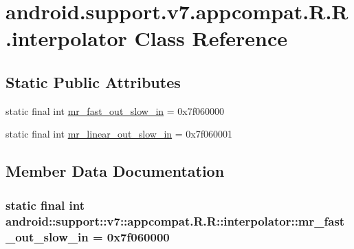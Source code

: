 \hypertarget{classandroid_1_1support_1_1v7_1_1appcompat_1_1_r_1_1interpolator}{
\section{android.support.v7.appcompat.R.R.interpolator Class Reference}
\label{classandroid_1_1support_1_1v7_1_1appcompat_1_1_r_1_1interpolator}
}
\subsection*{Static Public Attributes}
\begin{CompactItemize}
\item 
static final int \hyperlink{classandroid_1_1support_1_1v7_1_1appcompat_1_1_r_1_1interpolator_4ef563985c23b48d76c02abfcfc9ef9f}{mr\_\-fast\_\-out\_\-slow\_\-in} = 0x7f060000
\item 
static final int \hyperlink{classandroid_1_1support_1_1v7_1_1appcompat_1_1_r_1_1interpolator_ba755f548f835e271ce7ba885989fb6b}{mr\_\-linear\_\-out\_\-slow\_\-in} = 0x7f060001
\end{CompactItemize}


\subsection{Member Data Documentation}
\hypertarget{classandroid_1_1support_1_1v7_1_1appcompat_1_1_r_1_1interpolator_4ef563985c23b48d76c02abfcfc9ef9f}{
\subsubsection[{mr\_\-fast\_\-out\_\-slow\_\-in}]{\setlength{\rightskip}{0pt plus 5cm}static final int android::support::v7::appcompat.R.R::interpolator::mr\_\-fast\_\-out\_\-slow\_\-in = 0x7f060000}}
\label{classandroid_1_1support_1_1v7_1_1appcompat_1_1_r_1_1interpolator_4ef563985c23b48d76c02abfcfc9ef9f}



